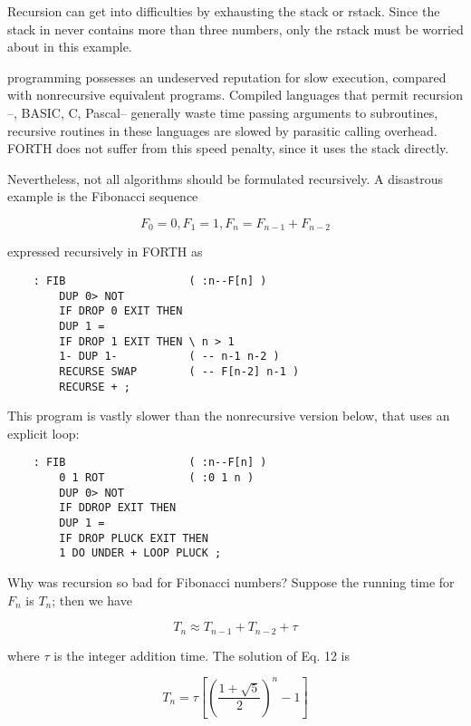 Recursion can get into difficulties by exhausting the stack or rstack. Since the stack in  never contains more than three numbers, only the rstack must be worried about in this example.

 programming possesses an undeserved reputation for slow execution, compared with nonrecursive equivalent programs. Compiled languages that permit recursion --\eg, BASIC, C, Pascal-- generally waste time passing arguments to subroutines, \ie recursive routines in these languages are slowed by parasitic calling overhead. FORTH does not suffer from this speed penalty, since it uses the stack directly.

Nevertheless, not all algorithms should be formulated recursively. A disastrous example is the Fibonacci sequence

\begin{equation}
F_0 = 0, F_1 = 1, F_n = F_{n-1} + F_{n-2}
\end{equation}

expressed recursively in FORTH as
\begin{lstlisting}
    : FIB                   ( :n--F[n] )
        DUP 0> NOT
        IF DROP 0 EXIT THEN
        DUP 1 = 
        IF DROP 1 EXIT THEN \ n > 1
        1- DUP 1-           ( -- n-1 n-2 )
        RECURSE SWAP        ( -- F[n-2] n-1 )
        RECURSE + ;
\end{lstlisting}

This program is vastly slower than the nonrecursive version below, that uses an explicit  loop:
\begin{lstlisting}
    : FIB                   ( :n--F[n] )
        0 1 ROT             ( :0 1 n )
        DUP 0> NOT
        IF DDROP EXIT THEN
        DUP 1 =
        IF DROP PLUCK EXIT THEN
        1 DO UNDER + LOOP PLUCK ;
\end{lstlisting}
Why was recursion so bad for Fibonacci numbers? Suppose the running time for $F_n$ is $T_n$; then we have

\begin{equation}
T_{n} \approx T_{n-1} + T_{n-2} + \tau
\end{equation}

where $\tau$ is the integer addition time. The solution of Eq. 12 is

\begin{equation}
T_{n} = \tau\left[\left(\frac{1+\sqrt{5}}{2}\right)^n - 1\right]
\end{equation}

